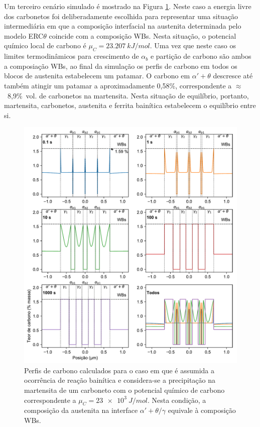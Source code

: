 Um terceiro cenário simulado é mostrado na Figura \ref{fig:cprofiles_coupled_mu23e3}. Neste caso a energia livre dos carbonetos foi deliberadamente escolhida para representar uma situação intermediária em que a composição interfacial na austenita determinada pelo modelo ERC$\theta$ coincide com a composição WBs. Nesta situação, o potencial químico local de carbono é $\mu_C = \SI{23.207}{kJ/mol}$. Uma vez que neste caso os limites termodinâmicos para crescimento de $\alpha_b$ e partição de carbono são ambos a composiação WBs, ao final da simulação os perfis de carbono em todos os blocos de austenita estabelecem um patamar. O carbono em $\alpha' + \theta$ descresce até também atingir um patamar a aproximadamente 0,58\%, correspondente a $\approx$~8,9\%~vol. de carbonetos na martensita. Nesta situação de equilíbrio, portanto, martensita, carbonetos, austenita e ferrita bainítica estabelecem o equilíbrio entre si.

\begin{figure}
  \includegraphics[width=.9\textwidth]{img/cpartition/cprofiles/coupled_FoFo_375_mu23e3_sep.pdf}
  \caption{Perfis de carbono calculados para o caso em que é assumida a ocorrência de reação bainítica e considera-se a precipitação na martensita de um carboneto com o potencial químico de carbono correspondente a $\mu_C = \SI{23e3}{J/mol}$. Nesta condição, a composição da austenita na interface $\alpha' + \theta/\gamma$ equivale à composição WBs.}
  \label{fig:cprofiles_coupled_mu23e3}
\end{figure}

